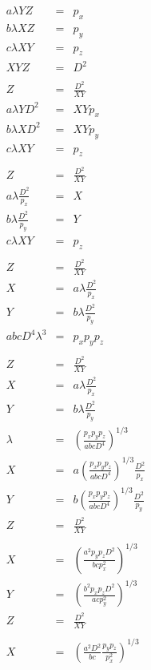 \documentclass[12pt]{book}
\begin{document}
\begin{eqnarray*}
a\lambda YZ &=& p_x \\
b\lambda XZ &=& p_y \\
c\lambda XY &=& p_z \\
XYZ         &=& D^2 \\
\\
Z             &=& \frac{D^2}{XY} \\
a\lambda YD^2 &=& XYp_x \\
b\lambda XD^2 &=& XYp_y \\
c\lambda XY   &=& p_z \\
\\
Z                        &=& \frac{D^2}{XY} \\
a\lambda \frac{D^2}{p_x}  &=& X \\
b\lambda \frac{D^2}{p_y}  &=& Y \\
c\lambda XY              &=& p_z \\
\\
Z                        &=& \frac{D^2}{XY} \\
X                        &=& a\lambda \frac{D^2}{p_x} \\
Y                        &=& b\lambda \frac{D^2}{p_y} \\
abcD^4\lambda^3          &=& p_xp_yp_z \\
\\
Z                        &=& \frac{D^2}{XY} \\
X                        &=& a\lambda \frac{D^2}{p_x} \\
Y                        &=& b\lambda \frac{D^2}{p_y} \\
\lambda                  &=& \left(\frac{p_xp_yp_z}{abcD^4}\right)^{1/3}
\\
X                        &=& a\left(\frac{p_xp_yp_z}{abcD^4}\right)^{1/3} \frac{D^2}{p_x} \\
Y                        &=& b\left(\frac{p_xp_yp_z}{abcD^4}\right)^{1/3} \frac{D^2}{p_y} \\
Z                        &=& \frac{D^2}{XY} \\
\\
X                        &=& \left(\frac{a^2p_yp_zD^2}{bcp_x^2}\right)^{1/3}  \\
Y                        &=& \left(\frac{b^2p_xp_zD^2}{acp_y^2}\right)^{1/3}  \\
Z                        &=& \frac{D^2}{XY}\\
\\
X                        &=& \left(\frac{a^2D^2}{bc}\frac{p_yp_z}{p_x^2}\right)^{1/3} \\

\end{eqnarray*}
\end{document}
